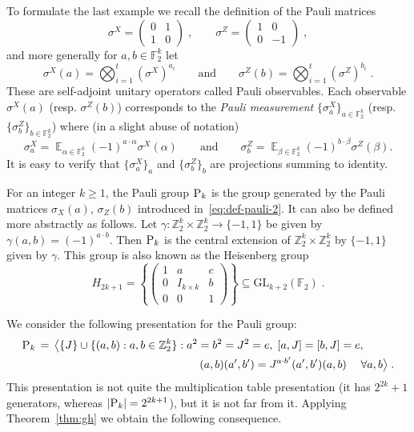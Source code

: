 \documentclass[11pt]{article}
\theoremstyle{definition}
\DeclareMathOperator*{\Expectation}{\mathbb{E}}
\newcommand{\Es}[1]{\Expectation_{#1}}
\newcommand{\F}{\ensuremath{\mathbb{F}}}
\newcommand{\Z}{\ensuremath{\mathbb{Z}}}
\newcommand{\gamestyle}[1]{\ensuremath{\textsc{#1}}\xspace}
\newcommand{\pauli}{\gamestyle{P}}
\begin{document}
To formulate the last example we recall the definition of the Pauli matrices
	\begin{equation}\label{eq:def-pauli-1} \sigma^X = \begin{pmatrix} 0 & 1 \\ 1 & 0 \end{pmatrix}\;,\qquad \sigma^Z = \begin{pmatrix} 1 & 0 \\ 0 & -1\end{pmatrix}\;,
	\end{equation}
	and more generally for $a,b\in \F_2^k$ let 
	\begin{equation}\label{eq:def-pauli-2}
	\sigma^X(a) = \bigotimes_{i=1}^t (\sigma^X)^{a_i}\qquad\text{and}\qquad\sigma^Z(b) = \bigotimes_{i=1}^t (\sigma^Z)^{b_i}\;.
	\end{equation}
These are self-adjoint unitary operators called Pauli observables. Each observable $\sigma^X(a)$ (resp. $\sigma^Z(b)$) corresponds to the \emph{Pauli measurement} $\{ \sigma^X_a \}_{a \in \F_2^k}$ (resp. $\{ \sigma^Z_b \}_{b \in \F_2^k}$) where (in a slight abuse of notation)  
	\[ \sigma^X_a = \Es{\alpha\in\F_2^k} (-1)^{a\cdot \alpha} \sigma^X(\alpha)\qquad\text{and}\qquad\sigma^Z_b = \Es{\beta\in\F_2^k} (-1)^{b\cdot\beta} \sigma^Z(\beta).\]
	It is easy to verify that $\{\sigma^X_a\}_a$ and $\{\sigma^Z_b\}_b$ are projections summing to identity.	
	
For an integer $k\geq 1$,  the Pauli group $\pauli_k$ is the group generated by the Pauli matrices $\sigma_X(a)$, $\sigma_Z(b)$ introduced in~\eqref{eq:def-pauli-2}. It can also be defined more abstractly as follows. Let $\gamma: \Z_2^k\times \Z_2^k \to \{-1,1\}$ be given by $\gamma(a,b)=(-1)^{a\cdot b}$. Then $\pauli_k$ is the central extension of $\Z_2^k\times \Z_2^k$ by $\{-1,1\}$ given by $\gamma$. This group 
is also known as the Heisenberg group 
\[ H_{2k+1} = \left \{ \begin{pmatrix} 1 & a & c \\ 0 & I_{k \times k} & b \\ 0 & 0 & 1 \end{pmatrix} \right\}\subseteq {\mathrm{GL}}_{k+2}(\F_2)\;.\]
 
We consider the following presentation for the Pauli group:
\begin{align*}
 \pauli_k \,=\, \big\langle \{J\}\cup  \{(a,b): a,b\in \Z_2^k\} &: a^2=b^2=J^2=e,\; [a,J]=[b,J]=e,\\
&\qquad  (a,b)(a',b') = J^{a\cdot b'} (a',b')(a,b) \; \quad \forall a,b\big\rangle\;.
\end{align*}
This presentation is not quite the multiplication table presentation (it has $2^{2k}+1$ generators, whereas $|\pauli_k|=2^{2k+1}$), but it is not far from it.  
Applying Theorem~\ref{thm:gh} we obtain the following consequence.%
\end{document}
